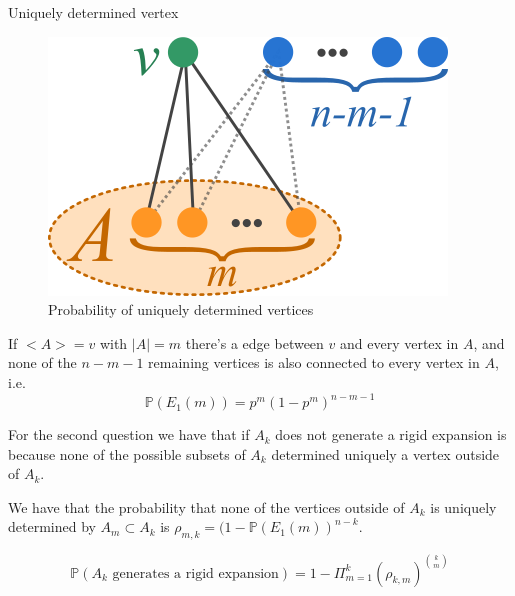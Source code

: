 \documentclass[handout]{beamer}
\theoremstyle{plain}
\renewcommand{\P}{\mathbb{P}}
\begin{document}
\begin{frame}{Uniquely determined vertex}

\begin{figure}[h!]
	\centering
	\includegraphics[scale=0.8]{CHARLA_STOCHASTIC_TOPOLOGY_MCG_CIMATNOVEMBER_2018/uni.png}
	\caption{Probability of uniquely determined vertices}
\end{figure}

If $<A> = v$ with $|A| = m$ there's a edge between $v$ and every vertex in $A$, and none of the $n-m-1$ remaining vertices is also connected to every vertex in $A$, i.e.
$$\P(E_1(m)) = p^{m}(1-p^{m})^{n-m-1}$$

\end{frame}

\begin{frame}
For the second question we have that if $A_k$ does not generate a rigid expansion is because none of the possible subsets of $A_k$ determined uniquely a vertex outside of $A_k$. 

We have that the probability that none of the vertices outside of $A_k$ is uniquely determined by $A_m\subset A_k$ is $\rho_{m,k} = (1 -  \P(E_1(m) )^{n-k}$.

$$\P(A_k \text{ generates a rigid expansion}) = 1 -  \Pi_{m=1}^{k} (\rho_{k,m})^{\binom{k}{m}}  $$

\end{frame}
\end{document}

